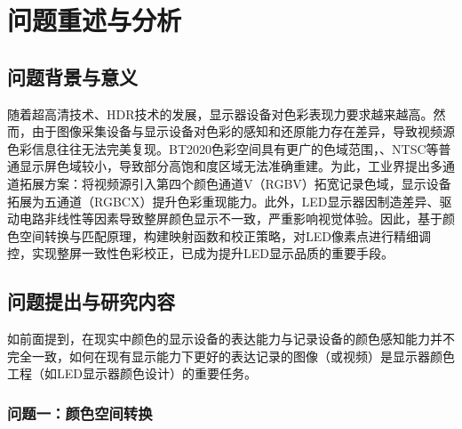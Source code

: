 \chapter[\hspace{0pt}问题重述与分析]{{\heiti{}\hspace{0pt}问题重述与分析}}\label{chapter1: 问题重述与分析}

\removelofgap
\removelotgap

\section[\hspace{-2pt}问题背景与意义]{{\heiti{} \hspace{-8pt}问题背景与意义}}\label{section1: 问题背景与意义}

随着超高清技术、HDR技术的发展，显示器设备对色彩表现力要求越来越高。然而，由于图像采集设备与显示设备对色彩的感知和还原能力存在差异，导致视频源色彩信息往往无法完美复现\cite{poynton2012digital}。BT2020色彩空间具有更广的色域范围，\cite{6784055}、NTSC等普通显示屏色域较小，导致部分高饱和度区域无法准确重建。为此，工业界提出多通道拓展方案：将视频源引入第四个颜色通道V（RGBV）拓宽记录色域，显示设备拓展为五通道（RGBCX）提升色彩重现能力。此外，LED显示器因制造差异、驱动电路非线性等因素导致整屏颜色显示不一致，严重影响视觉体验。因此，基于颜色空间转换与匹配原理，构建映射函数和校正策略，对LED像素点进行精细调控，实现整屏一致性色彩校正，已成为提升LED显示品质的重要手段。

\section[\hspace{-2pt}问题提出与研究内容]{{\heiti{} \hspace{-8pt}问题提出与研究内容}}\label{section1: 问题提出与研究内容}

如前面提到，在现实中颜色的显示设备的表达能力与记录设备的颜色感知能力并不完全一致，如何在现有显示能力下更好的表达记录的图像（或视频）是显示器颜色工程（如LED显示器颜色设计）的重要任务。

\subsection[\hspace{-2pt}问题一：颜色空间转换]{{\heiti{} \hspace{-8pt}问题一：颜色空间转换}}\label{subsection1: 问题一}

